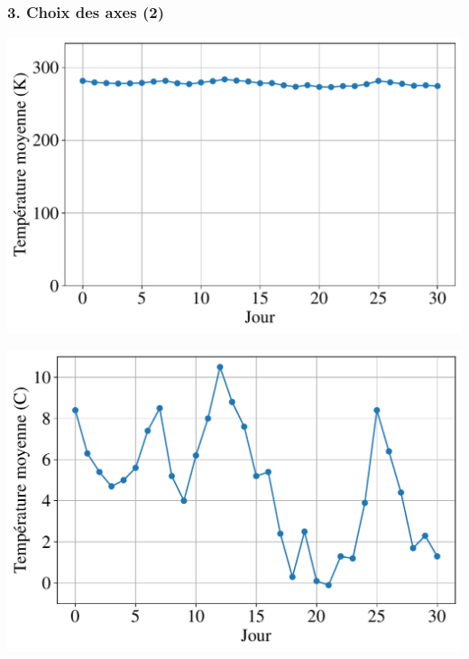 \documentclass[sans,14pt]{beamer}
\begin{document}
{\begin{frame}
  \frametitle{3. Choix des axes (2)}
  \begin{minipage}[h]{0.49\linewidth}
    \begin{center}
      \includegraphics[width=\textwidth]{../poly/figures/pratiques/line_start_zero}
    \end{center}
  \end{minipage}%
  \pause
  \hfill
  \begin{minipage}[h]{0.49\linewidth}
    \begin{center}
      \includegraphics[width=\textwidth]{../poly/figures/pratiques/line_start_nonzero}
    \end{center}
  \end{minipage}%
\end{frame}

}
\end{document}
